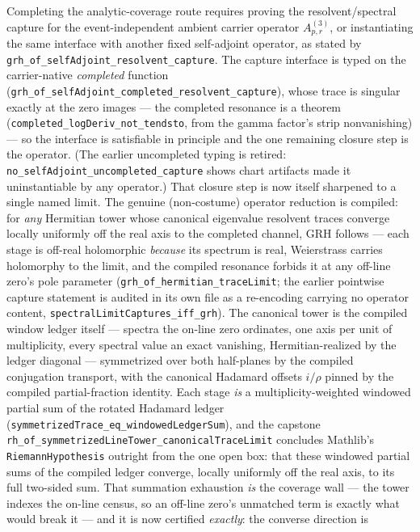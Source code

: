\documentclass[11pt]{article}
\theoremstyle{definition}
\begin{document}
Completing the analytic-coverage route requires proving the
resolvent/spectral capture for the event-independent ambient carrier operator
\(A^{(3)}_{p,r}\), or instantiating the same interface with another fixed
self-adjoint operator, as stated by
\texttt{grh\_of\_selfAdjoint\_resolvent\_capture}.  The capture interface is
typed on the carrier-native \emph{completed} function
(\texttt{grh\_of\_selfAdjoint\_completed\_resolvent\_capture}), whose trace
is singular exactly at the zero images --- the completed resonance is a
theorem (\texttt{completed\_logDeriv\_not\_tendsto}, from the gamma factor's
strip nonvanishing) --- so the interface is satisfiable in principle and the
one remaining closure step is the operator.  (The earlier uncompleted typing
is retired: \texttt{no\_selfAdjoint\_uncompleted\_capture} shows chart
artifacts made it uninstantiable by any operator.)  That closure step is now
itself sharpened to a single named limit.  The genuine (non-costume) operator
reduction is compiled: for \emph{any} Hermitian tower whose canonical
eigenvalue resolvent traces converge locally uniformly off the real axis to
the completed channel, GRH follows --- each stage is off-real holomorphic
\emph{because} its spectrum is real, Weierstrass carries holomorphy to the
limit, and the compiled resonance forbids it at any off-line zero's pole
parameter (\texttt{grh\_of\_hermitian\_traceLimit}; the earlier pointwise
capture statement is audited in its own file as a re-encoding carrying no
operator content, \texttt{spectralLimitCaptures\_iff\_grh}).  The canonical
tower is the compiled window ledger itself --- spectra the on-line zero
ordinates, one axis per unit of multiplicity, every spectral value an exact
vanishing, Hermitian-realized by the ledger diagonal --- symmetrized over
both half-planes by the compiled conjugation transport, with the canonical
Hadamard offsets $i/\rho$ pinned by the compiled partial-fraction identity.
Each stage \emph{is} a multiplicity-weighted windowed partial sum of the
rotated Hadamard ledger (\texttt{symmetrizedTrace\_eq\_windowedLedgerSum}),
and the capstone
\texttt{rh\_of\_symmetrizedLineTower\_canonicalTraceLimit} concludes
Mathlib's \texttt{RiemannHypothesis} outright from the one open box: that
these windowed partial sums of the compiled ledger converge, locally
uniformly off the real axis, to its full two-sided sum.  That summation
exhaustion \emph{is} the coverage wall --- the tower indexes the on-line
census, so an off-line zero's unmatched term is exactly what would break it
--- and it is now certified \emph{exactly}: the converse direction is
\end{document}
